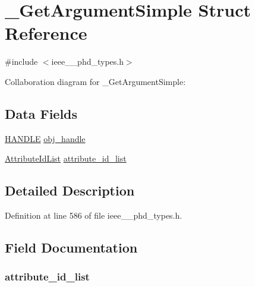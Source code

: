 \hypertarget{struct___get_argument_simple}{}\section{\+\_\+\+Get\+Argument\+Simple Struct Reference}
\label{struct___get_argument_simple}


{\ttfamily \#include $<$ieee\+\_\+\_\+phd\+\_\+types.\+h$>$}



Collaboration diagram for \+\_\+\+Get\+Argument\+Simple\+:
\subsection*{Data Fields}
\begin{DoxyCompactItemize}
\item 
\hyperlink{ieee__11073__phd__types_8h_a76f0d44d294babf2e568f7ee676ffca6}{H\+A\+N\+D\+L\+E} \hyperlink{struct___get_argument_simple_abbfff52b7a4956021522f5750c4b32c6}{obj\+\_\+handle}
\item 
\hyperlink{ieee__11073__phd__types_8h_a05788a328daf5addef323877eae54d4c}{Attribute\+Id\+List} \hyperlink{struct___get_argument_simple_ac1adc1c68e4b6be9222cd933f433f4cc}{attribute\+\_\+id\+\_\+list}
\end{DoxyCompactItemize}


\subsection{Detailed Description}


Definition at line 586 of file ieee\+\_\+\_\+phd\+\_\+types.\+h.



\subsection{Field Documentation}
\hypertarget{struct___get_argument_simple_ac1adc1c68e4b6be9222cd933f433f4cc}{}
\subsubsection[{attribute\+\_\+id\+\_\+list}]{ attribute\+\_\+id\+\_\+list}\label{struct___get_argument_simple_ac1adc1c68e4b6be9222cd933f433f4cc}


